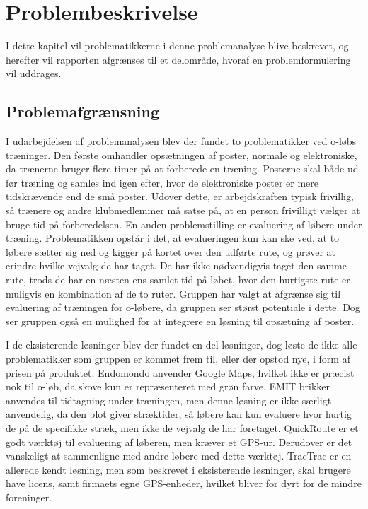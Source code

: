 \chapter{Problembeskrivelse}
I dette kapitel vil problematikkerne i denne problemanalyse blive beskrevet, og herefter vil rapporten afgrænses til et delområde, hvoraf en problemformulering vil uddrages.

\section{Problemafgrænsning}
I udarbejdelsen af problemanalysen blev der fundet to problematikker ved o-løbs træninger. Den første omhandler opsætningen af poster, normale og elektroniske, da trænerne bruger flere timer på at forberede en træning. Posterne skal både ud før træning og samles ind igen efter, hvor de elektroniske poster er mere tidskrævende end de små poster. Udover dette, er arbejdskraften typisk frivillig, så trænere og andre klubmedlemmer må satse på, at en person frivilligt vælger at bruge tid på forberedelsen. En anden problemstilling er evaluering af løbere under træning. Problematikken opstår i det, at evalueringen kun kan ske ved, at to løbere sætter sig ned og kigger på kortet over den udførte rute, og prøver at erindre hvilke vejvalg de har taget. De har ikke nødvendigvis taget den samme rute, trods de har en næsten ens samlet tid på løbet, hvor den hurtigste rute er muligvis en kombination af de to ruter. Gruppen har valgt at afgrænse sig til evaluering af træningen for o-løbere, da gruppen ser størst potentiale i dette. Dog ser gruppen også en mulighed for at integrere en løsning til opsætning af poster.

I de eksisterende løsninger blev der fundet en del løsninger, dog løste de ikke alle problematikker som gruppen er kommet frem til, eller der opstod nye, i form af prisen på produktet.
Endomondo anvender Google Maps, hvilket ikke er præcist nok til o-løb, da skove kun er repræsenteret med grøn farve. EMIT brikker anvendes til tidtagning under træningen, men denne løsning er ikke særligt anvendelig, da den blot giver stræktider, så løbere kan kun evaluere hvor hurtig de på de specifikke stræk, men ikke de vejvalg de har foretaget. QuickRoute er et godt værktøj til evaluering af løberen, men kræver et GPS-ur. Derudover er det vanskeligt at sammenligne med andre løbere med dette værktøj.
TracTrac er en allerede kendt løsning, men som beskrevet i eksisterende løsninger, skal brugere have licens, samt firmaets egne GPS-enheder, hvilket bliver for dyrt for de mindre foreninger.

